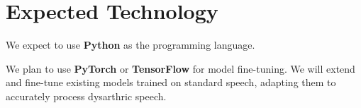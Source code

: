 \documentclass{article}
\begin{document}
\section{Expected Technology}
\begin{comment}
\wss{What programming language or languages do you expect to use?  What external
libraries?  What frameworks?  What technologies.  Are there major components of
the implementation that you expect you will implement, despite the existence of
libraries that provide the required functionality.  For projects with machine
learning, will you use pre-trained models, or be training your own model?  }

\wss{The implementation decisions can, and likely will, change over the course
of the project.  The initial documentation should be written in an abstract way;
it should be agnostic of the implementation choices, unless the implementation
choices are project constraints.  However, recording our initial thoughts on
implementation helps understand the challenge level and feasibility of a
project.  It may also help with early identification of areas where project
members will need to augment their training.}

Topics to discuss include the following:

\begin{itemize}
\item Specific programming language
\item Specific libraries
\item Pre-trained models
\item Specific linter tool (if appropriate)
\item Specific unit testing framework
\item Investigation of code coverage measuring tools
\item Specific plans for Continuous Integration (CI), or an explanation that CI
  is not being done
\item Specific performance measuring tools (like Valgrind), if
  appropriate
\item Tools you will likely be using?
\end{itemize}

\wss{git, GitHub and GitHub projects should be part of your technology.}
\end{comment}

We expect to use \textbf{Python} as the programming language. 

We plan to use \textbf{PyTorch} or \textbf{TensorFlow} for model fine-tuning. We will extend and fine-tune existing models trained on standard speech, adapting them to accurately process dysarthric speech.
\end{document}
